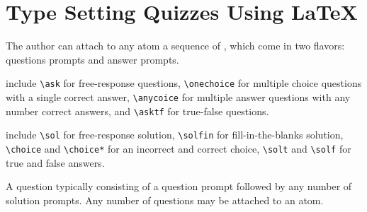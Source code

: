 \section{Type Setting Quizzes Using LaTeX}
\label{sec:quiz::type-setting-quizzes-using-latex}

\begin{cluster}
\label{grp:grm:quiz::author}

\begin{gram}
\label{grm:quiz::author}
The author can attach to any atom a sequence of , which come in two flavors: questions prompts and answer prompts.

\end{gram}
\end{cluster}

\begin{cluster}
\label{grp:grm:quiz::question}

\begin{gram}
\label{grm:quiz::question}
  include 
\lstinline`\ask` for free-response questions, 
\lstinline`\onechoice` for multiple choice questions with a single correct answer, 
\lstinline`\anycoice` for multiple answer questions with any number correct answers, and 
\lstinline`\asktf` for true-false questions.

\end{gram}
\end{cluster}

\begin{cluster}
\label{grp:grm:quiz::prompts}

\begin{gram}
\label{grm:quiz::prompts}
  include 
\lstinline`\sol` for free-response solution, 
\lstinline`\solfin` for fill-in-the-blanks solution, 
\lstinline`\choice` and \lstinline`\choice*` for an incorrect and correct choice, 
\lstinline`\solt` and \lstinline`\solf`   for true and false answers.

\end{gram}
\end{cluster}

\begin{cluster}
\label{grp:grm:quiz::typically}

\begin{gram}
\label{grm:quiz::typically}
A question typically consisting of a question prompt followed by any
number of solution prompts.  
Any number of questions may be attached  to an atom.

\end{gram}
\end{cluster}

